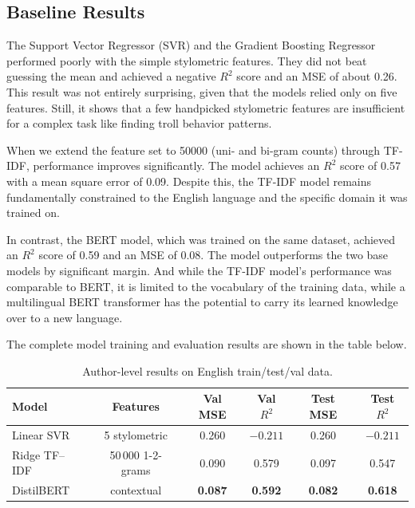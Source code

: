 \documentclass[twoside]{ctuthesis}
\theoremstyle{plain}
\theoremstyle{definition}
\theoremstyle{note}
\begin{document}
\subsection{Baseline Results}

The Support Vector Regressor (SVR) and the Gradient Boosting Regressor performed poorly with the simple stylometric features. They did not beat guessing the mean and achieved a negative $R^2$ score and an MSE of about 0.26. This result was not entirely surprising, given that the models relied only on five features. Still, it shows that a few handpicked stylometric features are insufficient for a complex task like finding troll behavior patterns.\par
When we extend the feature set to 50000 (uni- and bi-gram counts) through TF-IDF, performance improves significantly. The model achieves an $R^2$ score of 0.57 with a mean square error of 0.09. Despite this, the TF-IDF model remains fundamentally constrained to the English language and the specific domain it was trained on.\par
In contrast, the BERT model, which was trained on the same dataset, achieved an $R^2$ score of 0.59 and an MSE of 0.08. The model outperforms the two base models by significant margin. And while the TF-IDF model's performance was comparable to BERT, it is limited to the vocabulary of the training data, while a multilingual BERT transformer has the potential to carry its learned knowledge over to a new language.\par
The complete model training and evaluation results are shown in the table below.\par

\begin{table}[ht]
  \centering
  \caption{Author-level results on English train/test/val data.}
  \label{tab:en_author_results}
  \begin{tabular}{lccccc}
   \hline
   \textbf{Model} & \textbf{Features} &
   \textbf{Val MSE} & \textbf{Val $R^{2}$} &
   \textbf{Test MSE} & \textbf{Test $R^{2}$} \\
   \hline
 Linear SVR & 5 stylometric     & 0.260 & $-0.211$ & 0.260 & $-0.211$ \\
 Ridge TF--IDF & 50\,000 1-2-grams  & 0.090 & 0.579  & 0.097 & 0.547  \\
 DistilBERT & contextual  & \textbf{0.087} & \textbf{0.592} &
                     \textbf{0.082} & \textbf{0.618} \\
   \hline
  \end{tabular}
\end{table}
\end{document}
